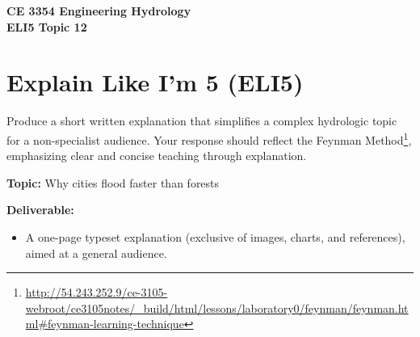 \documentclass[12pt]{article}
\begin{document}
\begin{center}
    \textbf{CE 3354 Engineering Hydrology\\
    ELI5 Topic 12}
\end{center}

\section*{Explain Like I’m 5 (ELI5)}

Produce a short written explanation that simplifies a complex hydrologic topic for a non-specialist audience. Your response should reflect the Feynman Method\footnote{\url{http://54.243.252.9/ce-3105-webroot/ce3105notes/_build/html/lessons/laboratory0/feynman/feynman.html#feynman-learning-technique}}, emphasizing clear and concise teaching through explanation.

\textbf{Topic:} Why cities flood faster than forests

\textbf{Deliverable:}
\begin{itemize}
    \item A one-page typeset explanation (exclusive of images, charts, and references), aimed at a general audience.
\end{itemize}
\end{document}
